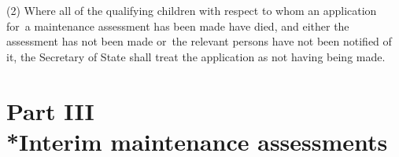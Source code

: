\documentclass[a4paper,12pt]{article}
\begin{document}
(2) Where all of the qualifying children with respect to whom an application for~a maintenance assessment has been made have died, and either the assessment has not been made or~the relevant persons have not been notified of it, 
the Secretary of State  %
shall treat the application as not having being made.


\section[Part III --- Interim maintenance assessments]{Part III\\*Interim maintenance assessments}

\renewcommand\parthead{--- Part III}
\end{document}
